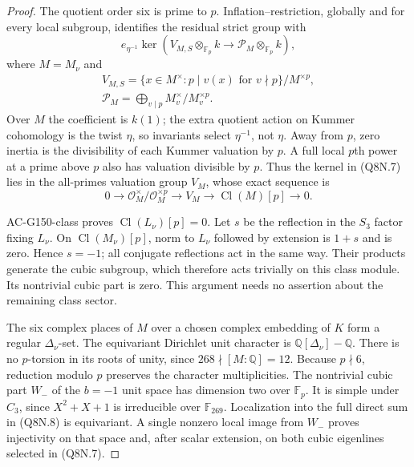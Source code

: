 \begin{proof}
The quotient order six is prime to $p$.
Inflation--restriction, globally and for every local subgroup,
identifies the residual strict group with
\[
 e_{\eta^{-1}}\ker\left(V_{M,S}\otimes_{\mathbb F_p}k
            \longrightarrow\mathcal P_M\otimes_{\mathbb F_p}k\right),
 \tag{Q8N.7}
\]
where $M=M_\nu$ and
\[
 \begin{gathered}
 V_{M,S}=\{x\in M^\times:p\mid v(x)\text{ for }v\nmid p\}/M^{\times p},\\
 \mathcal P_M=\bigoplus_{v\mid p}M_v^\times/M_v^{\times p}.
 \end{gathered}
 \tag{Q8N.8}
\]
Over $M$ the coefficient is $k(1)$; the extra quotient action on
Kummer cohomology is the twist $\eta$, so invariants select
$\eta^{-1}$, not $\eta$.
Away from $p$, zero inertia is the divisibility of each Kummer
valuation by $p$.  A full local $p$th power at a prime above $p$
also has valuation divisible by $p$.
Thus the kernel in (Q8N.7) lies in the all-primes valuation group
$V_M$, whose exact sequence is
\[
 0\longrightarrow\mathcal O_M^\times/\mathcal O_M^{\times p}
 \longrightarrow V_M\longrightarrow\operatorname{Cl}(M)[p]
 \longrightarrow0.
 \tag{Q8N.9}
\]

AC-G150-class proves $\operatorname{Cl}(L_\nu)[p]=0$.
Let $s$ be the reflection in the $S_3$ factor fixing $L_\nu$.
On $\operatorname{Cl}(M_\nu)[p]$, norm to $L_\nu$ followed by
extension is $1+s$ and is zero.
Hence $s=-1$; all conjugate reflections act in the same way.
Their products generate the cubic subgroup, which therefore acts
trivially on this class module.
Its nontrivial cubic part is zero.
This argument needs no assertion about the remaining class sector.

The six complex places of $M$ over a chosen complex embedding of
$K$ form a regular $\Delta_\nu$-set.
The equivariant Dirichlet unit character is
$\mathbb Q[\Delta_\nu]-\mathbb Q$.
There is no $p$-torsion in its roots of unity, since
$268\nmid[M:\mathbb Q]=12$.
Because $p\nmid6$, reduction modulo $p$ preserves the character
multiplicities.
The nontrivial cubic part $W_-$ of the $b=-1$ unit space has
dimension two over $\mathbb F_p$.
It is simple under $C_3$, since $X^2+X+1$ is irreducible over
$\mathbb F_{269}$.
Localization into the full direct sum in (Q8N.8) is equivariant.
A single nonzero local image from $W_-$ proves injectivity on
that space and, after scalar extension, on both cubic eigenlines
selected in (Q8N.7).


\end{proof}
